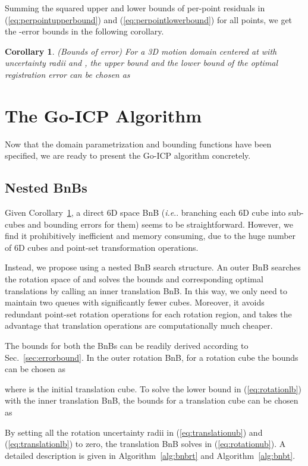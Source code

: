 \documentclass[10pt,journal,cspaper,compsoc]{IEEEtran}
\makeatletter
\DeclareRobustCommand\onedot{\futurelet\@let@token\@onedot}
\def\@onedot{\ifx\@let@token.\else.\null\fi\xspace}
\def\ie{\emph{i.e}\onedot} \def\Ie{\emph{I.e}\onedot}
\newtheorem{corollary}[theorem]{Corollary}
\makeatother
\begin{document}
Summing the squared upper and lower bounds of per-point residuals in (\ref{eq:perpointupperbound}) and (\ref{eq:perpointlowerbound}) for all  points, we get the -error bounds in the following corollary.

\begin{corollary}\label{cor:l2errorbounds}(Bounds of  error) For a 3D motion domain  centered at  with uncertainty radii  and , the upper bound  and the lower bound  of the optimal  registration error  can be chosen as

\end{corollary}

\section{The Go-ICP Algorithm}\label{sec:algorithm}
Now that the domain parametrization and bounding functions have been specified, we are ready to present the Go-ICP algorithm concretely.

\subsection{Nested BnBs}

Given Corollary~\ref{cor:l2errorbounds}, a direct 6D space BnB (\ie branching each 6D cube into  sub-cubes and bounding errors for them) seems to be straightforward. However, we find it prohibitively inefficient and memory consuming, due to the huge number of 6D cubes and point-set transformation operations.

Instead, we propose using a nested BnB search structure.  An outer BnB searches the rotation space of  and solves the bounds and corresponding optimal translations by calling an inner translation BnB. \textcolor[rgb]{0.00,0.00,0.00}{In this way, we only need to maintain two queues with significantly fewer cubes. Moreover, it avoids redundant point-set rotation operations for each rotation region, and takes the advantage that translation operations are computationally much cheaper.}

The bounds for both the BnBs can be readily derived according to Sec.~\ref{sec:errorbound}. In the outer rotation BnB, for a rotation cube  the bounds can be chosen as

where  is the initial translation cube. To solve the lower bound  in (\ref{eq:rotationlb}) with the inner translation BnB, the bounds for a translation cube  can be chosen as

By setting all the rotation uncertainty radii  in (\ref{eq:translationub}) and (\ref{eq:translationlb}) to zero, the translation BnB solves  in  (\ref{eq:rotationub}).
A detailed description is given in Algorithm~\ref{alg:bnbrt} and Algorithm~\ref{alg:bnbt}.
\end{document}
